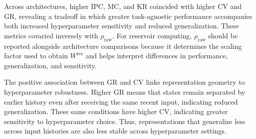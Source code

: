 \documentclass[mlabstract,onecolumn]{jmlr}
\begin{document}
Across architectures, higher IPC, MC, and KR coincided with higher CV and GR, revealing a tradeoff in which greater task-agnostic performance accompanies both increased hyperparameter sensitivity and reduced generalization. These metrics covaried inversely with \(\rho_{\mathrm{raw}}\). For reservoir computing, \(\rho_{\mathrm{raw}}\) should be reported alongside architecture comparisons because it determines the scaling factor used to obtain \(W^{\mathrm{res}}\) and helps interpret differences in performance, generalization, and sensitivity.

The positive association between GR and CV links representation geometry to hyperparameter robustness. Higher GR means that states remain separated by earlier history even after receiving the same recent input, indicating reduced generalization. These same conditions have higher CV, indicating greater sensitivity to hyperparameter choice. Thus, representations that generalize less across input histories are also less stable across hyperparameter settings.
\clearpage

\clearpage
\end{document}
